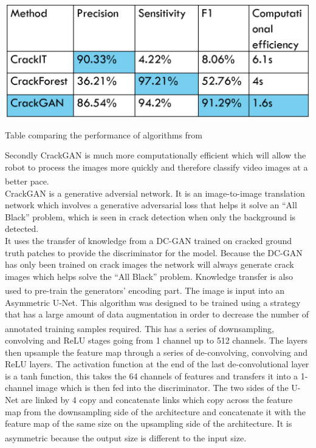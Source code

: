 \documentclass[11pt]{article}		%
\newcommand{\supercite}[1]{\textsuperscript{\cite{#1}}}		%
\begin{document}
        	\begin{table}[h]
				\centering
				\includegraphics[scale=0.75]{CrackGAN_comparisonv1.PNG}
				\caption{Table comparing the performance of algorithms from \cite{CrackGAN1}}
				\label{crack_comparison}
			\end{table}
        
	        Secondly CrackGAN is much more computationally efficient which will allow the robot to process the images more quickly and therefore classify video images at a better pace.\supercite{CrackGAN1}
			\\
			CrackGAN is a generative adversial network. 
			It is an image-to-image translation network which involves a generative adversarial loss that helps it solve an “All Black” problem, which is seen in crack detection when only the background is detected.
			\\
			It uses the transfer of knowledge from a DC-GAN trained on cracked ground truth patches to provide the discriminator for the model. Because the DC-GAN has only been trained on crack images the network will always generate crack images which helps solve the “All Black” problem. Knowledge transfer is also used to pre-train the generators’ encoding part.\supercite{CrackGAN1} 
	        The image is input into an Asymmetric U-Net. This algorithm was designed to be trained using a strategy that has a large amount of data augmentation in order to decrease the number of annotated training samples required.\supercite{U-Net} This has a series of downsampling, convolving and ReLU stages going from 1 channel up to 512 channels. The layers then upsample the feature map through a series of de-convolving, convolving and ReLU layers. The activation function at the end of the last de-convolutional layer is a tanh function, this takes the 64 channels of features and transfers it into a 1-channel image which is then fed into the discriminator. The two sides of the U-Net are linked by 4 copy and concatenate links which copy across the feature map from the downsampling side of the architecture and concatenate it with the feature map of the same size on the upsampling side of the architecture. It is asymmetric because the output size is different to the input size.\supercite{U-Net}
\end{document}
